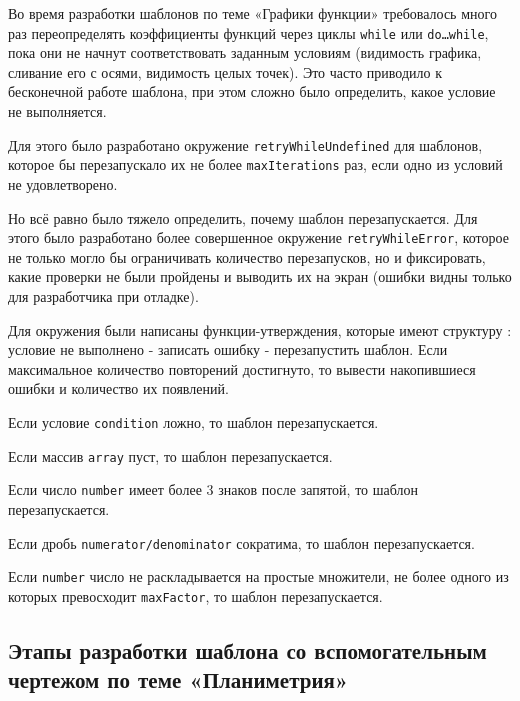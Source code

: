 Во время разработки шаблонов по теме «Графики функции» требовалось много раз переопределять коэффициенты функций через циклы 
\texttt{while} или \texttt{do\dots while}, пока они не начнут соответствовать заданным условиям (видимость графика, сливание его с осями, видимость целых точек). Это часто приводило к бесконечной работе шаблона, при этом сложно было определить, какое условие не выполняется.

Для этого было разработано окружение \texttt{retryWhileUndefined} для шаблонов, которое бы перезапускало их не более \texttt{maxIterations} раз, если одно из условий не удовлетворено. 


Но всё равно было тяжело определить, почему шаблон перезапускается. Для этого было разработано более совершенное окружение \texttt{retryWhileError}, которое не только могло бы ограничивать количество перезапусков, но и фиксировать, какие проверки не были пройдены и выводить их на экран (ошибки видны только для разработчика при отладке).


Для окружения были написаны функции-утверждения, которые имеют структуру : условие не выполнено - записать ошибку - перезапустить шаблон. Если максимальное количество повторений достигнуто, то вывести накопившиеся ошибки и количество их появлений. 

    Если условие \texttt{condition} ложно, то шаблон перезапускается. 

    Если массив \texttt{array} пуст, то шаблон перезапускается.

    Если число \texttt{number} имеет более 3 знаков после запятой, то шаблон перезапускается.
    
    Если дробь \texttt{numerator/denominator} сократима, то шаблон перезапускается.

    Если \texttt{number} число не раскладывается на простые множители, не более одного из которых превосходит \texttt{maxFactor}, то шаблон перезапускается. 

\subsection{Этапы разработки шаблона со вспомогательным чертежом по теме «Планиметрия»}


